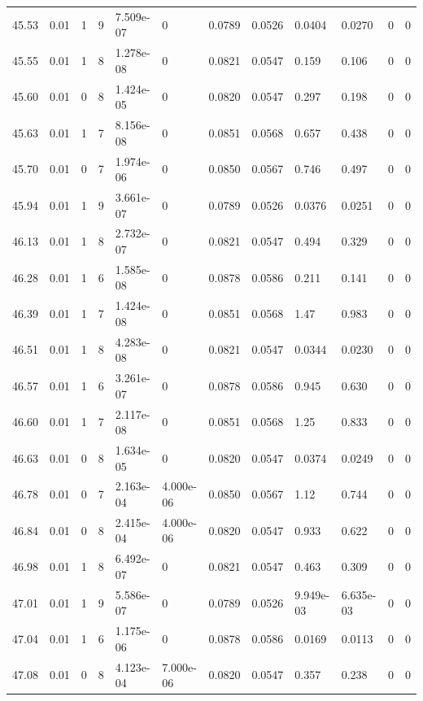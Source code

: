 \documentclass[preview]{standalone}
\begin{document}
{{{{{{{{{{{{\begin{tabular}{L{1.2cm}C{1.2cm} C{0.3cm}C{0.5cm} C{1.4cm}C{1.4cm} C{1.4cm}C{1.4cm} C{1.6cm}C{1.6cm} C{1.6cm}C{1.6cm}}
  45.53  &  0.01  & 1     &  9 &  7.509e-07  & 0  &  0.0789&   0.0526& 0.0404 & 0.0270   &  0 & 0  \\ 
  45.55  &  0.01  & 1     &  8 &  1.278e-08  & 0  &  0.0821&   0.0547& 0.159 & 0.106   &  0 & 0  \\ 
  45.60  &  0.01  & 0     &  8 &  1.424e-05  & 0  &  0.0820&   0.0547& 0.297 & 0.198   &  0 & 0  \\ 
  45.63  &  0.01  & 1     &  7 &  8.156e-08  & 0  &  0.0851&   0.0568& 0.657 & 0.438   &  0 & 0  \\ 
  45.70  &  0.01  & 0     &  7 &  1.974e-06  & 0  &  0.0850&   0.0567& 0.746 & 0.497   &  0 & 0  \\ 
  45.94  &  0.01  & 1     &  9 &  3.661e-07  & 0  &  0.0789&   0.0526& 0.0376 & 0.0251   &  0 & 0  \\ 
  46.13  &  0.01  & 1     &  8 &  2.732e-07  & 0  &  0.0821&   0.0547& 0.494 & 0.329   &  0 & 0  \\ 
  46.28  &  0.01  & 1     &  6 &  1.585e-08  & 0  &  0.0878&   0.0586& 0.211 & 0.141   &  0 & 0  \\ 
  46.39  &  0.01  & 1     &  7 &  1.424e-08  & 0  &  0.0851&   0.0568& 1.47 & 0.983   &  0 & 0  \\ 
  46.51  &  0.01  & 1     &  8 &  4.283e-08  & 0  &  0.0821&   0.0547& 0.0344 & 0.0230   &  0 & 0  \\ 
  46.57  &  0.01  & 1     &  6 &  3.261e-07  & 0  &  0.0878&   0.0586& 0.945 & 0.630   &  0 & 0  \\ 
  46.60  &  0.01  & 1     &  7 &  2.117e-08  & 0  &  0.0851&   0.0568& 1.25 & 0.833   &  0 & 0  \\ 
  46.63  &  0.01  & 0     &  8 &  1.634e-05  & 0  &  0.0820&   0.0547& 0.0374 & 0.0249   &  0 & 0  \\ 
  46.78  &  0.01  & 0     &  7 &  2.163e-04  & 4.000e-06  &  0.0850&   0.0567& 1.12 & 0.744   &  0 & 0  \\ 
  46.84  &  0.01  & 0     &  8 &  2.415e-04  & 4.000e-06  &  0.0820&   0.0547& 0.933 & 0.622   &  0 & 0  \\ 
  46.98  &  0.01  & 1     &  8 &  6.492e-07  & 0  &  0.0821&   0.0547& 0.463 & 0.309   &  0 & 0  \\ 
  47.01  &  0.01  & 1     &  9 &  5.586e-07  & 0  &  0.0789&   0.0526& 9.949e-03 & 6.635e-03   &  0 & 0  \\ 
  47.04  &  0.01  & 1     &  6 &  1.175e-06  & 0  &  0.0878&   0.0586& 0.0169 & 0.0113   &  0 & 0  \\ 
  47.08  &  0.01  & 0     &  8 &  4.123e-04  & 7.000e-06  &  0.0820&   0.0547& 0.357 & 0.238   &  0 & 0  \\ 

\end{tabular}}}}}}}}}}}}}
\end{document}
